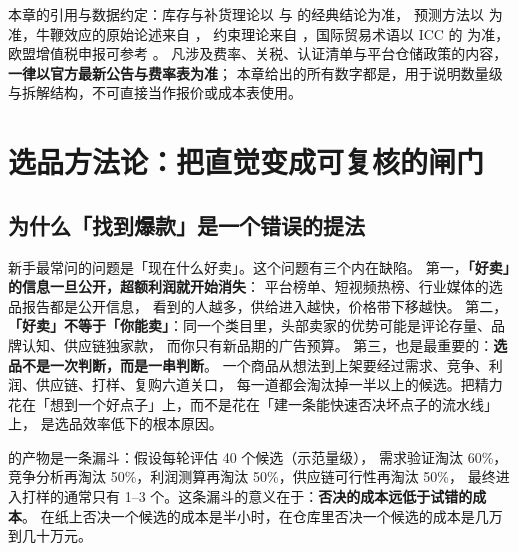 本章的引用与数据约定：库存与补货理论以 \cite{silver1998inventory} 与 \cite{chopra2019supply} 的经典结论为准，
预测方法以 \cite{hyndman2021forecasting} 为准，牛鞭效应的原始论述来自 \cite{lee1997bullwhip}，
约束理论来自 \cite{goldratt2004goal}，国际贸易术语以 ICC 的 \cite{incoterms2020} 为准，
欧盟增值税申报可参考 \cite{eu_oss}。
凡涉及费率、关税、认证清单与平台仓储政策的内容，\textbf{一律以官方最新公告与费率表为准}；
本章给出的所有数字都是，用于说明数量级与拆解结构，不可直接当作报价或成本表使用。

\section{选品方法论：把直觉变成可复核的闸门}
\label{sec:sup-select}

\subsection{为什么「找到爆款」是一个错误的提法}

新手最常问的问题是「现在什么好卖」。这个问题有三个内在缺陷。
第一，\textbf{「好卖」的信息一旦公开，超额利润就开始消失}：
平台榜单、短视频热榜、行业媒体的选品报告都是公开信息，
看到的人越多，供给进入越快，价格带下移越快。
第二，\textbf{「好卖」不等于「你能卖」}：同一个类目里，头部卖家的优势可能是评论存量、品牌认知、供应链独家款，
而你只有新品期的广告预算。
第三，也是最重要的：\textbf{选品不是一次判断，而是一串判断}。
一个商品从想法到上架要经过需求、竞争、利润、供应链、打样、复购六道关口，
每一道都会淘汰掉一半以上的候选。把精力花在「想到一个好点子」上，而不是花在「建一条能快速否决坏点子的流水线」上，
是选品效率低下的根本原因。

的产物是一条漏斗：假设每轮评估 40 个候选（示范量级），
需求验证淘汰 60\%，竞争分析再淘汰 50\%，利润测算再淘汰 50\%，供应链可行性再淘汰 50\%，
最终进入打样的通常只有 1--3 个。这条漏斗的意义在于：\textbf{否决的成本远低于试错的成本}。
在纸上否决一个候选的成本是半小时，在仓库里否决一个候选的成本是几万到几十万元。

